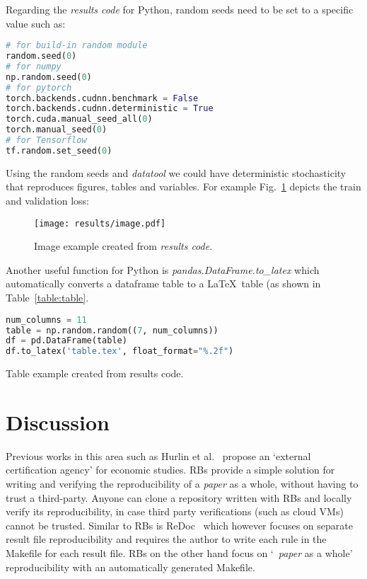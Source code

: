 \documentclass[journal]{IEEEtran}
\begin{document}
Regarding the \textit{results code} for Python, random seeds need to be set to a specific value such as:
\begin{lstlisting}[language=python, style=lststyle, caption={Python reproducibility commands for some popular libraries.}, captionpos=b]
# for build-in random module
random.seed(0)
# for numpy
np.random.seed(0)
# for pytorch
torch.backends.cudnn.benchmark = False
torch.backends.cudnn.deterministic = True
torch.cuda.manual_seed_all(0)
torch.manual_seed(0)
# for Tensorflow
tf.random.set_seed(0)
\end{lstlisting}

Using the random seeds and \textit{datatool} we could have deterministic stochasticity that reproduces figures, tables and variables.
For example Fig.~\ref{fig:image} depicts the train and validation loss:
\begin{figure}[h]
	\texttt{[image: results/image.pdf]}
	\caption{Image example created from \textit{results code}.}
	\label{fig:image}
\end{figure}

Another useful function for Python is \textit{pandas.DataFrame.to\_latex} which automatically converts a dataframe table to a \LaTeX\ table (as shown in Table~\ref{table:table}.

\begin{lstlisting}[language=python, style=lststyle, caption={Convert Pandas DataFrame to \LaTeX\ table.}, captionpos=b]
num_columns = 11
table = np.random.random((7, num_columns))
df = pd.DataFrame(table)
df.to_latex('table.tex', float_format="%.2f")
\end{lstlisting}

\begin{table}[h]
	\centering
	\caption{Table example created from results code.}
	\label{table:table}
	\setlength\tabcolsep{4.2pt}
	
\end{table}

\section{Discussion}
Previous works in this area such as Hurlin et al.~\cite{hurlin2019reproducibility} propose an `external certification agency' for economic studies.
RBs provide a simple solution for writing and verifying the reproducibility of a \textit{paper} as a whole, without having to trust a third-party.
Anyone can clone a repository written with RBs and locally verify its reproducibility, in case third party verifications (such as cloud VMs) cannot be trusted.
Similar to RBs is ReDoc~\cite{schwab2000making} which however focuses on separate result file reproducibility and requires the author to write each rule in the Makefile for each result file.
RBs on the other hand focus on `~\textit{paper} as a whole' reproducibility with an automatically generated Makefile.
\end{document}
